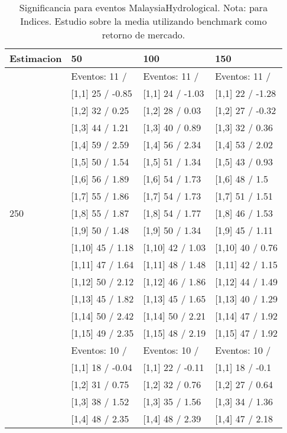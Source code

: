 \begin{table}

\caption{Significancia para eventos MalaysiaHydrological. Nota: para Indices. Estudio sobre la media utilizando benchmark como retorno de mercado.}
\centering
\begin{tabular}[t]{llll}
\toprule
Estimacion & 50 & 100 & 150\\
\midrule
 & Eventos:  11 / & Eventos:  11 / & Eventos:  11 /\\
 & {}[1,1] 25  / -0.85 & {}[1,1] 24  / -1.03 & {}[1,1] 22  / -1.28\\
 & {}[1,2] 32  / 0.25 & {}[1,2] 28  / 0.03 & {}[1,2] 27  / -0.32\\
 & {}[1,3] 44  / 1.21 & {}[1,3] 40  / 0.89 & {}[1,3] 32  / 0.36\\
 & {}[1,4] 59  / 2.59 & {}[1,4] 56  / 2.34 & {}[1,4] 53  / 2.02\\
\addlinespace
 & {}[1,5] 50  / 1.54 & {}[1,5] 51  / 1.34 & {}[1,5] 43  / 0.93\\
 & {}[1,6] 56  / 1.89 & {}[1,6] 54  / 1.73 & {}[1,6] 48  / 1.5\\
 & {}[1,7] 55  / 1.86 & {}[1,7] 54  / 1.73 & {}[1,7] 51  / 1.51\\
250 & {}[1,8] 55  / 1.87 & {}[1,8] 54  / 1.77 & {}[1,8] 46  / 1.53\\
 & {}[1,9] 50  / 1.48 & {}[1,9] 50  / 1.34 & {}[1,9] 45  / 1.11\\
\addlinespace
 & {}[1,10] 45  / 1.18 & {}[1,10] 42  / 1.03 & {}[1,10] 40  / 0.76\\
 & {}[1,11] 47  / 1.64 & {}[1,11] 48  / 1.48 & {}[1,11] 42  / 1.15\\
 & {}[1,12] 50  / 2.12 & {}[1,12] 46  / 1.86 & {}[1,12] 44  / 1.49\\
 & {}[1,13] 45  / 1.82 & {}[1,13] 45  / 1.65 & {}[1,13] 40  / 1.29\\
 & {}[1,14] 50  / 2.42 & {}[1,14] 50  / 2.21 & {}[1,14] 47  / 1.92\\
\addlinespace
 & {}[1,15] 49  / 2.35 & {}[1,15] 48  / 2.19 & {}[1,15] 47  / 1.92\\
 & Eventos:  10 / & Eventos:  10 / & Eventos:  10 /\\
 & {}[1,1] 18  / -0.04 & {}[1,1] 22  / -0.11 & {}[1,1] 18  / -0.1\\
 & {}[1,2] 31  / 0.75 & {}[1,2] 32  / 0.76 & {}[1,2] 27  / 0.64\\
 & {}[1,3] 38  / 1.52 & {}[1,3] 35  / 1.56 & {}[1,3] 34  / 1.36\\
\addlinespace
 & {}[1,4] 48  / 2.35 & {}[1,4] 48  / 2.39 & {}[1,4] 47  / 2.18\\

\end{tabular}
\end{table}
